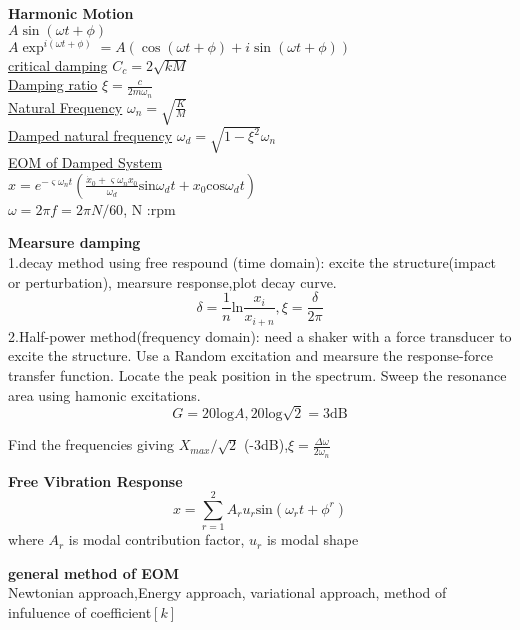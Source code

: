 \documentclass{article}
\begin{document}
\thispagestyle{empty}
\begin{multicols*}{3}

  \noindent\textbf{Harmonic Motion}\\
  $A \sin(\omega t + \phi)$\\
  $A \exp^{i(\omega t + \phi)} = A(\cos(\omega t + \phi) + i\sin(\omega t + \phi))$\\
  \underline{critical damping} $C_{c}=2\sqrt{kM}$\\
  \underline{Damping ratio} $\xi =\frac{c}{2m\omega_{n}}$\\
  \underline{Natural Frequency} $\omega_{n}=\sqrt{\frac{K}{M}}$\\
  \underline{Damped natural frequency} $\omega_{d}=\sqrt{1-\xi^{2}}\omega_{n}$\\
  \underline{EOM of Damped System}\\
  $x=e^{-\varsigma \omega_{n}t}(\frac{\dot{x}_{0}+\varsigma \omega_{n}x_{0}}{\omega_{d}}\text{sin}\omega_{d}t+x_{0}\text{cos}\omega_{d}t)$\\
  $\omega=2\pi f=2\pi N/60$, N :rpm

\noindent\textbf{Mearsure damping}\\
1.decay method using free respound (time domain):
excite the structure(impact or perturbation), mearsure response,plot decay curve.
\begin{equation*}
  \delta=\frac{1}{n}\text{ln}\frac{x_{i}}{x_{i+n}}, \xi =\frac{\delta}{2\pi}
\end{equation*}
2.Half-power method(frequency domain): need a shaker with a force transducer to excite the structure. Use a Random excitation and mearsure the response-force transfer function. Locate the peak position in the spectrum.
Sweep the resonance area using hamonic excitations.
\begin{equation*}
  G=20\text{log}A,20\text{log}\sqrt{2}=3\text{dB}
\end{equation*}

Find the frequencies giving $X_{max}/\sqrt{2}$ (-3dB),$\xi =\frac{\Delta \omega}{2\omega_n}$

\noindent\textbf{Free Vibration Response}\\
\begin{equation*}
  {x}=\sum_{r=1}^{2}A_{r}u_{r}\text{sin}(\omega_{r}t+\phi^{r})
\end{equation*}
where $A_{r}$ is modal contribution factor, $u_{r}$ is modal shape

\noindent\textbf{general method of EOM}\\
Newtonian approach,Energy approach, variational approach,
method of infuluence of coefficient$[k]$


\end{multicols*}
\end{document}

